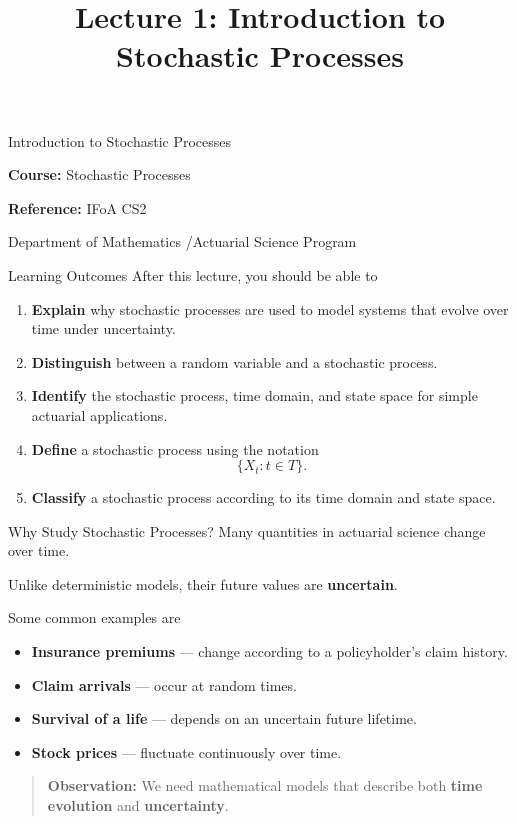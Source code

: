 \documentclass[
  ignorenonframetext,
  aspectratio=169,
]{beamer}
\title{\texorpdfstring{Lecture 1: Introduction to Stochastic
Processes}{Lecture 1: Introduction to Stochastic Processes}}
\author{}
\date{}
\providecommand{\tightlist}{%
  \setlength{\itemsep}{0pt}\setlength{\parskip}{0pt}}
\begin{document}
\frame{\titlepage}


\begin{frame}{Introduction to Stochastic Processes}
\protect{}\label{introduction-to-stochastic-processes}
\vspace{0.5cm}

\textbf{Course:} Stochastic Processes

\textbf{Reference:} IFoA CS2

\vfill

Department of Mathematics /Actuarial Science Program
\end{frame}

\begin{frame}{Learning Outcomes}
\protect{}\label{learning-outcomes}
After this lecture, you should be able to

\begin{enumerate}
\item
  \textbf{Explain} why stochastic processes are used to model systems
  that evolve over time under uncertainty.
\item
  \textbf{Distinguish} between a random variable and a stochastic
  process.
\item
  \textbf{Identify} the stochastic process, time domain, and state space
  for simple actuarial applications.
\item
  \textbf{Define} a stochastic process using the notation \[
  \{X_t:t\in T\}.
  \]
\item
  \textbf{Classify} a stochastic process according to its time domain
  and state space.
\end{enumerate}
\end{frame}

\begin{frame}{Why Study Stochastic Processes?}
\protect{}\label{why-study-stochastic-processes}
Many quantities in actuarial science change over time.

Unlike deterministic models, their future values are \textbf{uncertain}.

Some common examples are

\begin{itemize}
\tightlist
\item
  \textbf{Insurance premiums} --- change according to a policyholder's
  claim history.
\item
  \textbf{Claim arrivals} --- occur at random times.
\item
  \textbf{Survival of a life} --- depends on an uncertain future
  lifetime.
\item
  \textbf{Stock prices} --- fluctuate continuously over time.
\end{itemize}

\begin{quote}
\textbf{Observation:} We need mathematical models that describe both
\textbf{time evolution} and \textbf{uncertainty}.
\end{quote}
\end{frame}
\end{document}
